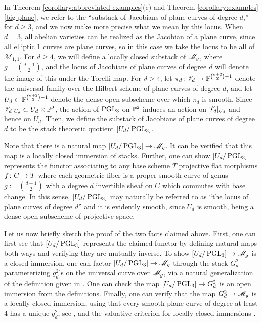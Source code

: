 \begin{remark}
	\label{remark:locus-of-plane-curves}
	In Theorem \ref{corollary:abbreviated-examples}(c) and Theorem \ref{corollary:examples}\autoref{big-plane},
	we refer to the ``substack of Jacobians of plane curves of degree $d$,'' for $d \geq 3$,
	and we now make more precise what we mean
	by this locus.
	When $d=3$, all abelian varieties can be realized as the Jacobian of a plane curve,
	since all elliptic $1$ curves are plane curves, so in this case we take the locus to be all of $\mathscr M_{1,1}$.
	For $d \geq 4$, we will define a locally closed substack of ${\mathscr M_g}$, where $g = \binom{d-1}{2}$,
	and the locus of Jacobians of plane curves of degree $d$ will denote the image of this under the Torelli map.
	For $d \geq 4$, let $\pi_d\colon \mathscr V_d \rightarrow {\mathbb P}^{\binom{d+2}{2}-1}$ denote the universal family over 
	the Hilbert scheme of plane curves of degree $d$,
	and let $U_d \subset {\mathbb P}^{\binom{d+2}{2}-1}$ denote the dense open subscheme 
	over which $\pi_d$ is smooth.
	Since $\mathscr V_d|_{U_d} \subset U_d \times {\mathbb P}^2$,
	the action of $\operatorname{PGL}_3$ on ${\mathbb P}^2$ induces an action on $\mathscr V_d|_{U_d}$ and hence on $U_d$.
	Then, we define the substack of Jacobians of plane curves of degree $d$
	to be the stack theoretic quotient $[U_d/\operatorname{PGL}_3]$.
	
	Note that there is a natural map $[U_d/\operatorname{PGL}_3] \rightarrow {\mathscr M_g}$.
	It can be verified that this map is a locally closed immersion of stacks. Further, one
	can show $[U_d/\operatorname{PGL}_3]$ represents the functor associating to any base scheme $T$
	projective flat morphisms $f \colon C \rightarrow T$ where each geometric fiber is a proper smooth curve of genus $g := \binom{d-1}{2}$
	with a degree $d$ invertible sheaf on $C$ which commutes with base change.	
	In this sense, $[U_d/\operatorname{PGL}_3]$ may naturally be referred to as ``the locus of plane curves of degree $d$''
	and it is evidently smooth, since $U_d$ is smooth, being a dense open subscheme of projective space.

	Let us now briefly sketch the proof of the two facts claimed above.
	First, one can first see that $[U_d/\operatorname{PGL}_3]$ represents the claimed
	functor by defining natural maps both ways and verifying they are mutually inverse.
	To show $[U_d/\operatorname{PGL}_3] \rightarrow {\mathscr M_g}$ is a closed immersion,
	one can factor $[U_d/\operatorname{PGL}_3] \rightarrow {\mathscr M_g}$ through the stack $G^2_d$ parameterizing $g^2_d$'s on 
	the universal curve over ${\mathscr M_g}$,
	via a natural generalization of the definition given in \cite[Chapter XXI, Definition 3.12]{ACMG:geometryOfCurves}.
	One can check the map $[U_d/\operatorname{PGL}_3] \rightarrow G^2_d$ is an open immersion from the definitions.
	Finally, one can verify that the map $G^2_d \rightarrow {\mathscr M_g}$ is a locally closed immersion, using that
	every smooth plane curve of degree at least $4$ has a unique $g^2_d$, see \cite[Appendix A, Exercises 17 and 18]{ACGH:I},
	and the valuative criterion for locally closed immersions \cite[Chapter 1, Corollary 2.13]{mochizuki2014foundations}.
\end{remark}

